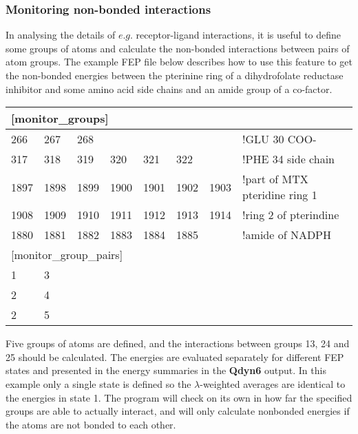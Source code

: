 \documentclass[a4paper,11pt]{article}
\begin{document}
\subsubsection{Monitoring non-bonded interactions}
In analysing the details of $e.g.$ receptor-ligand interactions, it
is useful to define some groups of atoms and calculate the
non-bonded interactions between pairs of atom groups. The example
FEP file below describes how to use this feature to get the
non-bonded energies between the pterinine ring of a dihydrofolate
reductase inhibitor and some amino acid side chains and an amide
group of a co-factor.

\begin{center}
\begin{tabularx}{\textwidth}{|l l l l l l l|X|}
  \hline \multicolumn{7}{|l|}{[monitor{\_}groups]} & \\
  \hline 266  & 267  & 268  &      &      &      &      & !GLU 30 COO- \\
  \hline 317  & 318  & 319  & 320  & 321  & 322  &      & !PHE 34 side chain \\
  \hline 1897 & 1898 & 1899 & 1900 & 1901 & 1902 & 1903 & !part of MTX pteridine ring 1 \\
  \hline 1908 & 1909 & 1910 & 1911 & 1912 & 1913 & 1914 & !ring 2 of pterindine \\
  \hline 1880 & 1881 & 1882 & 1883 & 1884 & 1885 &      & !amide of NADPH \\
  \hline \multicolumn{7}{|l|}{[monitor{\_}group{\_}pairs]} & \\
  \hline 1 & 3 &&&&&&\\
  \hline 2 & 4 &&&&&&\\
  \hline 2 & 5 &&&&&&\\ \hline
\end{tabularx}
\end{center}

Five groups of atoms are defined, and the interactions between
groups 1{\-}3, 2{\-}4 and 2{\-}5 should be calculated. The
energies are evaluated separately for different FEP states and
presented in the energy summaries in the \textbf{Qdyn6} output. In this
example only a single state is defined so the $\lambda $-weighted
averages are identical to the energies in state 1.
The program will check on its own in how far the specified groups are able
to actually interact, and will only calculate nonbonded energies if
the atoms are not bonded to each other.
\end{document}

